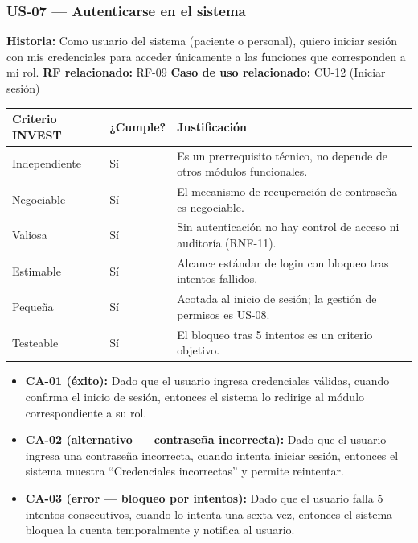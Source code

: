 \documentclass[11pt,a4paper]{article}
\providecommand{\tightlist}{%
	\setlength{\itemsep}{0pt}\setlength{\parskip}{0pt}}
\begin{document}
	\subsubsection{US-07 --- Autenticarse en el sistema}
	
	\textbf{Historia:} Como usuario del sistema (paciente o personal), quiero iniciar sesión con mis credenciales para acceder únicamente a las funciones que corresponden a mi rol.
	\textbf{RF relacionado:} RF-09
	\textbf{Caso de uso relacionado:} CU-12 (Iniciar sesión)
	
	\begin{longtable}{p{} p{} p{}}
		
		
		\toprule
		\textbf{Criterio INVEST} &
		\textbf{¿Cumple?} &
		\textbf{Justificación} \\
		\midrule
		\endhead
		
		Independiente & Sí & Es un prerrequisito técnico, no depende de otros módulos funcionales. \\
		Negociable & Sí & El mecanismo de recuperación de contraseña es negociable. \\
		Valiosa & Sí & Sin autenticación no hay control de acceso ni auditoría (RNF-11). \\
		Estimable & Sí & Alcance estándar de login con bloqueo tras intentos fallidos. \\
		Pequeña & Sí & Acotada al inicio de sesión; la gestión de permisos es US-08. \\
		Testeable & Sí & El bloqueo tras 5 intentos es un criterio objetivo. \\
		
		\bottomrule
	\end{longtable}
	
	\begin{itemize}
		\tightlist
		\item
		\textbf{CA-01 (éxito):} Dado que el usuario ingresa credenciales válidas, cuando confirma el inicio de sesión, entonces el sistema lo redirige al módulo correspondiente a su rol.
		\item
		\textbf{CA-02 (alternativo --- contraseña incorrecta):} Dado que el usuario ingresa una contraseña incorrecta, cuando intenta iniciar sesión, entonces el sistema muestra ``Credenciales incorrectas'' y permite reintentar.
		\item
		\textbf{CA-03 (error --- bloqueo por intentos):} Dado que el usuario falla 5 intentos consecutivos, cuando lo intenta una sexta vez, entonces el sistema bloquea la cuenta temporalmente y notifica al usuario.
	\end{itemize}
	
\end{document}
